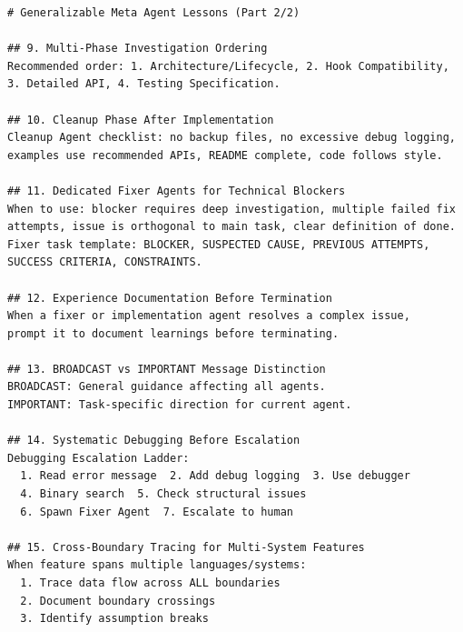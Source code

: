 \begin{listing}[H]
{\tiny
\begin{lstlisting}
# Generalizable Meta Agent Lessons (Part 2/2)

## 9. Multi-Phase Investigation Ordering
Recommended order: 1. Architecture/Lifecycle, 2. Hook Compatibility,
3. Detailed API, 4. Testing Specification.

## 10. Cleanup Phase After Implementation
Cleanup Agent checklist: no backup files, no excessive debug logging,
examples use recommended APIs, README complete, code follows style.

## 11. Dedicated Fixer Agents for Technical Blockers
When to use: blocker requires deep investigation, multiple failed fix
attempts, issue is orthogonal to main task, clear definition of done.
Fixer task template: BLOCKER, SUSPECTED CAUSE, PREVIOUS ATTEMPTS,
SUCCESS CRITERIA, CONSTRAINTS.

## 12. Experience Documentation Before Termination
When a fixer or implementation agent resolves a complex issue,
prompt it to document learnings before terminating.

## 13. BROADCAST vs IMPORTANT Message Distinction
BROADCAST: General guidance affecting all agents.
IMPORTANT: Task-specific direction for current agent.

## 14. Systematic Debugging Before Escalation
Debugging Escalation Ladder:
  1. Read error message  2. Add debug logging  3. Use debugger
  4. Binary search  5. Check structural issues
  6. Spawn Fixer Agent  7. Escalate to human

## 15. Cross-Boundary Tracing for Multi-System Features
When feature spans multiple languages/systems:
  1. Trace data flow across ALL boundaries
  2. Document boundary crossings
  3. Identify assumption breaks
\end{lstlisting}
}
\caption{Meta-agent lessons from the distributed DuckDB project, part~2 of~2 (condensed). Lessons 9--15 cover investigation ordering, cleanup, debugging escalation, and cross-boundary tracing.}
\label{lst:duckdb_lessons_2}
\end{listing}
